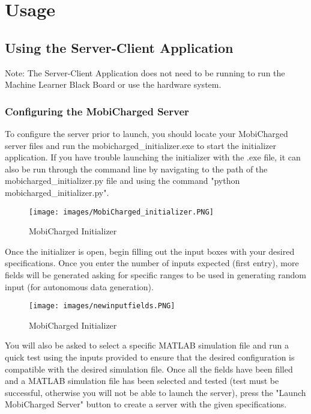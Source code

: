 \documentclass[12pt, titlepage]{article}
\begin{document}
\section{Usage}
\subsection{Using the Server-Client Application}
Note: The Server-Client Application does not need to be running to run the Machine Learner Black Board or use the hardware system. 
\subsubsection{Configuring the MobiCharged Server}
To configure the server prior to launch, you should locate your MobiCharged server files and run the mobicharged\_initializer.exe to start the initializer application. If you have trouble launching the initializer with the .exe file, it can also be run through the command line by navigating to the path of the mobicharged\_initializer.py file and using the command "python mobicharged\_initializer.py". 
\begin{figure}[H]
    \centering
    \texttt{[image: images/MobiCharged\_initializer.PNG]}
    \caption{MobiCharged Initializer}
    \label{fig:my_label}
\end{figure}

Once the initializer is open, begin filling out the input boxes with your desired specifications. Once you enter the number of inputs expected (first entry), more fields will be generated asking for specific ranges to be used in generating random input (for autonomous data generation). 
\begin{figure}[H]
    \centering
    \texttt{[image: images/newinputfields.PNG]}
    \caption{MobiCharged Initializer}
    \label{fig:my_label2}
\end{figure}
You will also be asked to select a specific MATLAB simulation file and run a quick test using the inputs provided to ensure that the desired configuration is compatible with the desired simulation file. Once all the fields have been filled and a MATLAB simulation file has been selected and tested (test must be successful, otherwise you will not be able to launch the server), press the "Launch MobiCharged Server" button to create a server with the given specifications.
\end{document}
